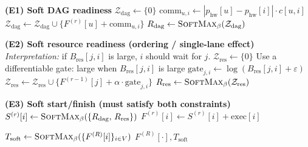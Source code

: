 \begin{algorithm}[!htbp]
\begin{algorithmic}[1]

        \Statex \textbf{(E1) Soft DAG readiness}
        \State $\mathcal{Z}_{\mathrm{dag}}\gets \{0\}$
            \State $\text{comm}_{u,i}\gets |p_{\mathrm{hw}}[u]-p_{\mathrm{hw}}[i]|\cdot c[u,i]$
            \State $\mathcal{Z}_{\mathrm{dag}}\gets \mathcal{Z}_{\mathrm{dag}}\cup\{F^{(r)}[u]+\text{comm}_{u,i}\}$
        \EndFor
        \State $R_{\mathrm{dag}}\gets \textsc{SoftMax}_\beta(\mathcal{Z}_{\mathrm{dag}})$

        \Statex \textbf{(E2) Soft resource readiness (ordering / single-lane effect)}
        \Statex \emph{Interpretation:} if $B_{\mathrm{res}}[j,i]$ is large, $i$ should wait for $j$.
        \State $\mathcal{Z}_{\mathrm{res}}\gets \{0\}$
            \Statex \quad Use a differentiable gate: large when $B_{\mathrm{res}}[j,i]$ is large
            \State $\text{gate}_{j,i}\gets \log(B_{\mathrm{res}}[j,i]+\varepsilon)$
            \State $\mathcal{Z}_{\mathrm{res}}\gets \mathcal{Z}_{\mathrm{res}}\cup\{F^{(r-1)}[j] + \alpha\cdot \text{gate}_{j,i}\}$
        \EndFor
        \State $R_{\mathrm{res}}\gets \textsc{SoftMax}_\beta(\mathcal{Z}_{\mathrm{res}})$

        \Statex \textbf{(E3) Soft start/finish (must satisfy both constraints)}
        \State $S^{(r)}[i]\gets \textsc{SoftMax}_\beta(\{R_{\mathrm{dag}},\, R_{\mathrm{res}}\})$
        \State $F^{(r)}[i]\gets S^{(r)}[i]+\text{exec}[i]$
    \EndFor
\EndFor

\State $T_{\mathrm{soft}}\gets \textsc{SoftMax}_\beta(\{F^{(R)}[i]\}_{i\in V})$
\State \Return $F^{(R)}[\cdot], T_{\mathrm{soft}}$
\end{algorithmic}
\end{algorithm}

%

